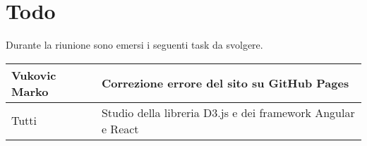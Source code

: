 \section{Todo}
Durante la riunione sono emersi i seguenti task da svolgere.

\begin{center}
  \begin{tabular}{|p{5cm}|p{7cm}|}
    \hline
    Vukovic Marko & Correzione errore del sito su GitHub Pages\\ \hline
    Tutti & Studio della libreria D3.js e dei framework Angular e React\\ \hline
   \end{tabular}
\end{center}
